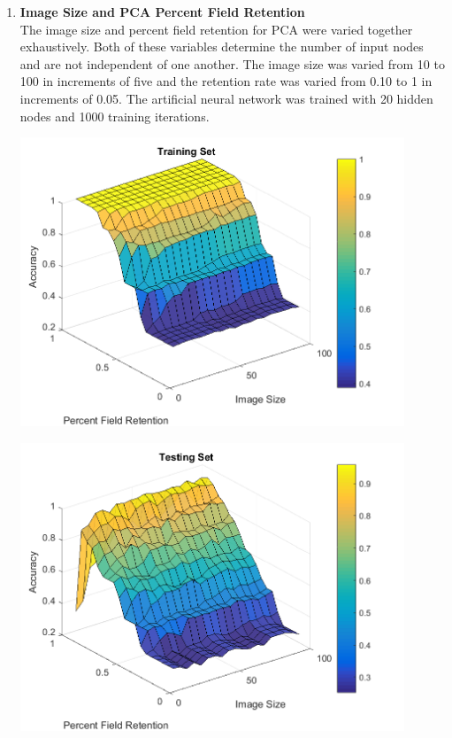 \documentclass[12pt]{article}
\begin{document}
\begin{enumerate}
  \item \textbf{Image Size and PCA Percent Field Retention}\\
  The image size and percent field retention for PCA were varied together exhaustively. Both of these variables determine the number of input nodes and are not independent of one another. The image size was varied from 10 to 100 in increments of five and the retention rate was varied from 0.10 to 1 in increments of 0.05. The artificial neural network was trained with 20 hidden nodes and 1000 training iterations.\\
  \begin{center}
    \includegraphics[width=115mm]{./figs/num_fields_empirical_training.png}
    \label{fig:img_size_train}
  \end{center}
  \begin{center}
    \includegraphics[width=115mm]{./figs/num_fields_empirical_testing.png}

\end{center}
\end{enumerate}
\end{document}
